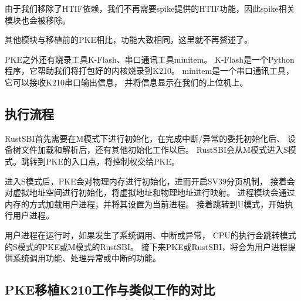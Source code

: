 由于我们移除了HTIF依赖，我们不再需要spike提供的HTIF功能，因此spike相关模块也会被移除。

其他模块与移植前的PKE相比，功能大致相同，这里就不再赘述了。

PKE之外还有烧录工具K-Flash、串口通讯工具minitem。
K-Flash是一个Python程序，它帮助我们将打包好的内核烧录到K210\cite{2002Flash}。
minitem是一个串口通讯工具，它可以接收K210串口输出信息，
并将信息显示在我们的上位机上。


\subsection{执行流程}



RustSBI首先需要在M模式下进行初始化，在完成中断/异常的委托初始化后、
设备树文件加载和解析后，还有其他初始化工作以后。
RustSBI会从M模式进入S模式。跳转到PKE的入口点，将控制权交给PKE。

进入S模式后，PKE会对物理内存进行初始化，进而开启SV39分页机制，
接着会对虚拟地址空间进行初始化，将虚拟地址和物理地址进行映射。
进程模块会通过内存的方式加载用户进程，并将其设置为当前进程。
接着跳转到U模式，开始执行用户进程。

用户进程在运行时，如果发生了系统调用、中断或异常，
CPU的执行会跳转模式的S模式的PKE或M模式的RustSBI。
接下来PKE或RustSBI，将会为用户进程提供系统调用功能、处理异常或中断的功能。


\subsection{PKE移植K210工作与类似工作的对比}

